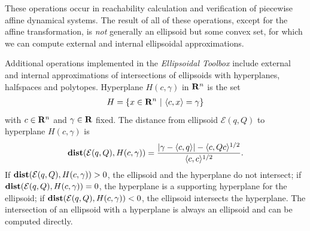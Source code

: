 \documentclass[letterpaper,10pt,english]{sphinxmanual}
\begin{document}
These operations occur in reachability calculation and verification of
piecewise affine dynamical systems. The result of all of these
operations, except for the affine transformation, is \emph{not} generally an
ellipsoid but some convex set, for which we can compute external and
internal ellipsoidal approximations.

Additional operations implemented in the \emph{Ellipsoidal Toolbox} include
external and internal approximations of intersections of ellipsoids with
hyperplanes, halfspaces and polytopes. Hyperplane $H(c,\gamma)$ in
${\bf R}^n$ is the set
\label{chap_ellcalc:equation-hyperplane}\begin{gather}
\begin{split}H = \{x\in{\bf R}^n ~|~ \langle c, x\rangle = \gamma\}\end{split}\label{chap_ellcalc-hyperplane}
\end{gather}
with $c\in{\bf R}^n$ and $\gamma\in{\bf R}$ fixed.
The distance from ellipsoid ${\mathcal E}(q,Q)$ to
hyperplane $H(c,\gamma)$ is
\label{chap_ellcalc:equation-dist_hp}\begin{gather}
\begin{split}{\bf dist}({\mathcal E}(q,Q),H(c,\gamma)) =
\frac{\left|\gamma-\langle c,q\rangle\right| -
\langle c,Qc\rangle^{1/2}}{\langle c,c\rangle^{1/2}}.\end{split}\label{chap_ellcalc-dist_hp}
\end{gather}
If ${\bf dist}({\mathcal E}(q,Q),H(c,\gamma))>0$, the ellipsoid
and the hyperplane do not intersect; if
${\bf dist}({\mathcal E}(q,Q),H(c,\gamma))=0$, the hyperplane is a
supporting hyperplane for the ellipsoid; if
${\bf dist}({\mathcal E}(q,Q),H(c,\gamma))<0$, the ellipsoid
intersects the hyperplane. The intersection of an ellipsoid with a
hyperplane is always an ellipsoid and can be computed directly.
\end{document}
